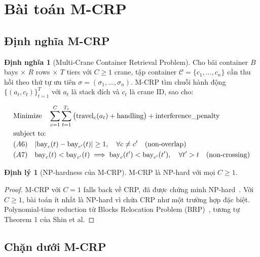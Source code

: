 \documentclass[11pt,a4paper]{article}
\theoremstyle{definition}
\newtheorem{definition}{Định nghĩa}[section]
\newtheorem{theorem}{Định lý}[section]
\newcommand{\1}{\mathbbm{1}}
\begin{document}
\section{Bài toán M-CRP}

\subsection{Định nghĩa M-CRP}

\begin{definition}[Multi-Crane Container Retrieval Problem]
Cho bãi container $B$ bays $\times$ $R$ rows $\times$ $T$ tiers với $C \geq 1$ crane, tập container $\mathcal{C} = \{c_1, \dots, c_n\}$ cần thu hồi theo thứ tự ưu tiên $\sigma = (\sigma_1, \dots, \sigma_n)$. M-CRP tìm chuỗi hành động $\{(a_t, c_t)\}_{t=1}^T$ với $a_t$ là stack đích và $c_t$ là crane ID, sao cho:

\begin{align}
    &\text{Minimize} \quad \sum_{c=1}^C \sum_{t=1}^{T_c} \big( \text{travel}_c(a_t) + \text{handling} \big) + \text{interference\_penalty} \\
    &\text{subject to:} \notag \\
    &(A6) \quad |\text{bay}_{c}(t) - \text{bay}_{c'}(t)| \geq 1, \quad \forall c \neq c' \quad (\text{non-overlap}) \\
    &(A7) \quad \text{bay}_c(t) < \text{bay}_{c'}(t) \implies \text{bay}_c(t') < \text{bay}_{c'}(t'), \quad \forall t' > t \quad (\text{non-crossing})
\end{align}
\end{definition}

\begin{theorem}[NP-hardness của M-CRP]
M-CRP là NP-hard với mọi $C \geq 1$.
\end{theorem}

\begin{proof}
M-CRP với $C = 1$ falls back về CRP, đã được chứng minh NP-hard~\cite{shin2026}. Với $C \geq 1$, bài toán ít nhất là NP-hard vì chứa CRP như một trường hợp đặc biệt. Polynomial-time reduction từ Blocks Relocation Problem (BRP)~\cite{caserta2012}, tương tự Theorem 1 của Shin et al.
\end{proof}

\subsection{Chặn dưới M-CRP}
\end{document}

